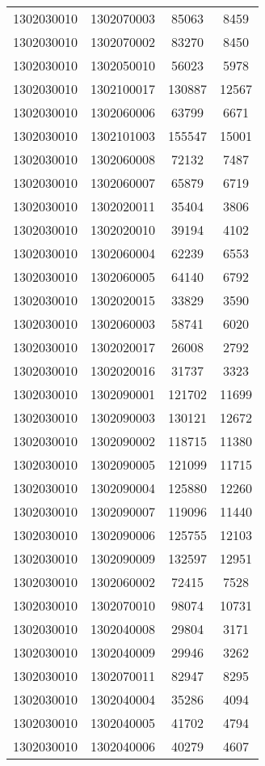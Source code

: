\begin{longtable}{llcc}
1302030010 & 1302070003 & 85063 & 8459\\
1302030010 & 1302070002 & 83270 & 8450\\
1302030010 & 1302050010 & 56023 & 5978\\
1302030010 & 1302100017 & 130887 & 12567\\
1302030010 & 1302060006 & 63799 & 6671\\
1302030010 & 1302101003 & 155547 & 15001\\
1302030010 & 1302060008 & 72132 & 7487\\
1302030010 & 1302060007 & 65879 & 6719\\
1302030010 & 1302020011 & 35404 & 3806\\
1302030010 & 1302020010 & 39194 & 4102\\
1302030010 & 1302060004 & 62239 & 6553\\
1302030010 & 1302060005 & 64140 & 6792\\
1302030010 & 1302020015 & 33829 & 3590\\
1302030010 & 1302060003 & 58741 & 6020\\
1302030010 & 1302020017 & 26008 & 2792\\
1302030010 & 1302020016 & 31737 & 3323\\
1302030010 & 1302090001 & 121702 & 11699\\
1302030010 & 1302090003 & 130121 & 12672\\
1302030010 & 1302090002 & 118715 & 11380\\
1302030010 & 1302090005 & 121099 & 11715\\
1302030010 & 1302090004 & 125880 & 12260\\
1302030010 & 1302090007 & 119096 & 11440\\
1302030010 & 1302090006 & 125755 & 12103\\
1302030010 & 1302090009 & 132597 & 12951\\
1302030010 & 1302060002 & 72415 & 7528\\
1302030010 & 1302070010 & 98074 & 10731\\
1302030010 & 1302040008 & 29804 & 3171\\
1302030010 & 1302040009 & 29946 & 3262\\
1302030010 & 1302070011 & 82947 & 8295\\
1302030010 & 1302040004 & 35286 & 4094\\
1302030010 & 1302040005 & 41702 & 4794\\
1302030010 & 1302040006 & 40279 & 4607\\

\end{longtable}
